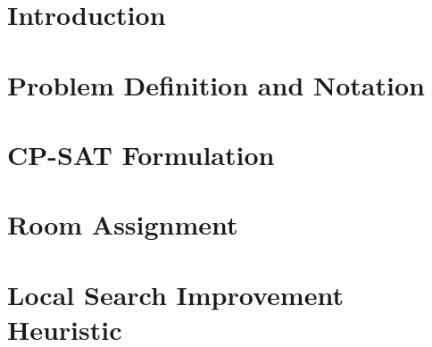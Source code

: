 \documentclass[conference]{IEEEtran}
\title{\PaperTitle}
\author{
\IEEEauthorblockN{\PaperAuthor}
\IEEEauthorblockA{
\textit{\PaperAffiliation} \\
\PaperEmail
}
}
\begin{document}
\maketitle

\begin{abstract}
We present an end-to-end university timetabling system that schedules lectures, tutorials, and labs over a fixed weekly grid.
The solver combines a CP-SAT feasibility model (OR-Tools), two room-assignment modes (integrated CP rooming and fast greedy rooming), and an optional local-search post-improver.
The implementation also includes a phased solve pipeline for UI use: feasibility-first search under a time budget followed by iterative improvement rounds.
On generated scenarios (\texttt{small\_demo}, \texttt{block\_profs}, \texttt{mixed\_large}, \texttt{target\_case}),
24/24 reliability runs are feasible under retry/fallback settings.
For larger scenarios, requested fast greedy rooming is consistently faster than requested strict CP rooming
(about \(1.59\times\) to \(1.98\times\) in this batch).
Local-search ablations show additional quality gains after feasibility (up to \(1.13\%\) median penalty reduction on \texttt{block\_profs}).
We provide model details, system architecture, release-ready reproducibility tooling, and implementation-grounded limitations.
\end{abstract}

\section{Introduction}


\section{Problem Definition and Notation}


\section{CP-SAT Formulation}


\section{Room Assignment}


\section{Local Search Improvement Heuristic}

\end{document}
